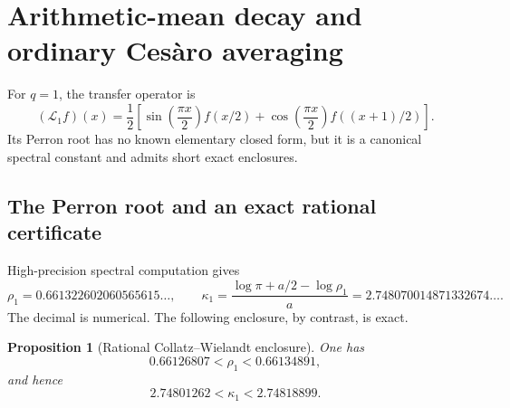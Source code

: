 \documentclass[11pt,oneside]{article}
\numberwithin{equation}{section}
\newtheorem{proposition}[theorem]{Proposition}
\theoremstyle{definition}
\theoremstyle{remark}
\newcommand{\Transfer}{\mathcal L}
\begin{document}
\section{Arithmetic-mean decay and ordinary Ces\`aro averaging}
\label{sec:cesaro}

For \(q=1\), the transfer operator is
\begin{equation}
 (\Transfer_1f)(x)=\frac12\left[
 \sin\!\left(\frac{\pi x}{2}\right)f(x/2)
 +\cos\!\left(\frac{\pi x}{2}\right)f((x+1)/2)
 \right].
 \label{eq:L1}
\end{equation}
Its Perron root has no known elementary closed form, but it is a canonical spectral constant
and admits short exact enclosures.

\subsection{The Perron root and an exact rational certificate}

High-precision spectral computation gives
\begin{equation}
 \rho_1=0.661322602060565615\ldots,
 \qquad
 \boxed{
 \kappa_1=\frac{\log\pi+a/2-\log\rho_1}{a}}
 =2.748070014871332674\ldots .
 \label{eq:rho1-kappa1}
\end{equation}
The decimal is numerical.  The following enclosure, by contrast, is exact.

\begin{proposition}[Rational Collatz--Wielandt enclosure]
\label{prop:rho-certificate}
One has
\begin{equation}
 0.66126807<\rho_1<0.66134891,
 \label{eq:rho-bracket}
\end{equation}
and hence
\begin{equation}
 2.74801262<\kappa_1<2.74818899.
 \label{eq:kappa1-bracket}
\end{equation}
\end{proposition}
\end{document}
